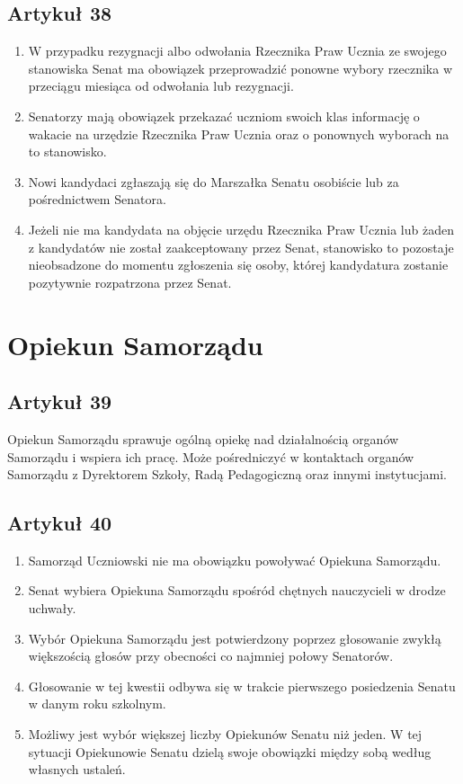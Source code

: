 \documentclass[14pt]{article}
\newenvironment{ustepy}{%
	\begin{enumerate}[leftmargin=1.5em, itemindent=1pt, labelwidth=1em, itemsep=5pt]
	}{%
	\end{enumerate}
}
\begin{document}
\subsection*{Artykuł 38}
\begin{ustepy}
	\item W przypadku rezygnacji albo odwołania Rzecznika Praw Ucznia ze swojego stanowiska Senat ma obowiązek przeprowadzić ponowne wybory rzecznika w przeciągu miesiąca od odwołania lub rezygnacji.
	\item Senatorzy mają obowiązek przekazać uczniom swoich klas informację o wakacie na urzędzie Rzecznika Praw Ucznia oraz o ponownych wyborach na to stanowisko.
	\item Nowi kandydaci zgłaszają się do Marszałka Senatu osobiście lub za pośrednictwem Senatora.
	\item Jeżeli nie ma kandydata na objęcie urzędu Rzecznika Praw Ucznia lub żaden z kandydatów nie został zaakceptowany przez Senat, stanowisko to pozostaje nieobsadzone do momentu zgłoszenia się osoby, której kandydatura zostanie pozytywnie rozpatrzona przez Senat.
\end{ustepy}
\newpage
\section{Opiekun Samorządu}
\subsection*{Artykuł 39}
Opiekun Samorządu sprawuje ogólną opiekę nad działalnością organów Samorządu i wspiera ich pracę. Może pośredniczyć w kontaktach organów Samorządu z Dyrektorem Szkoły, Radą Pedagogiczną oraz innymi instytucjami.
\subsection*{Artykuł 40}
\begin{ustepy}
	\item Samorząd Uczniowski nie ma obowiązku powoływać Opiekuna Samorządu.
	\item Senat wybiera Opiekuna Samorządu spośród chętnych nauczycieli w drodze uchwały.
	\item Wybór Opiekuna Samorządu jest potwierdzony poprzez głosowanie zwykłą większością głosów przy obecności co najmniej połowy Senatorów.
	\item Głosowanie w tej kwestii odbywa się w trakcie pierwszego posiedzenia Senatu w danym roku szkolnym. 
	\item Możliwy jest wybór większej liczby Opiekunów Senatu niż jeden. W tej sytuacji Opiekunowie Senatu dzielą swoje obowiązki między sobą według własnych ustaleń.
\end{ustepy}
\end{document}
